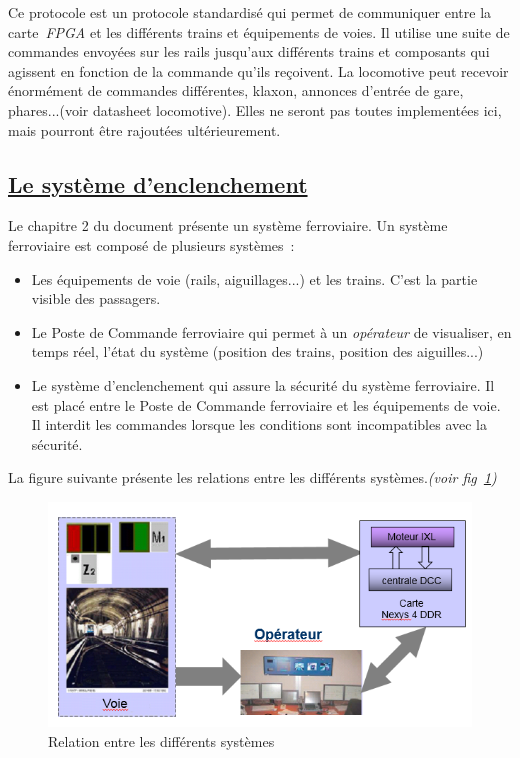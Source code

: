Ce protocole est un protocole standardis\'e qui permet de communiquer
entre la carte~\emph{FPGA} et les diff\'erents trains et
équipements de voies.
Il utilise une suite de commandes envoy\'ees sur les rails
jusqu'aux diff\'erents trains et composants qui agissent en fonction de
la commande qu'ils reçoivent.
La locomotive peut recevoir \'enormément de commandes différentes,
klaxon, annonces d'entr\'ee de gare, phares...(voir datasheet
locomotive). Elles ne seront pas toutes implement\'ees ici, mais
pourront \^etre rajout\'ees ult\'erieurement. 


\subsection{\underline{Le système d'enclenchement}}
\label{sec:logixl}

Le chapitre 2 du document \cite{sun2015} présente un système
ferroviaire. Un système ferroviaire est compos\'e de plusieurs systèmes~:
\begin{itemize}
  \item Les \'equipements de voie (rails, aiguillages...) et les
    trains. C'est la partie visible des passagers. 
  \item Le Poste de Commande ferroviaire qui permet à un \emph{op\'erateur} de
    visualiser, en temps r\'eel, l'\'etat du système (position des trains,
    position des aiguilles...)
  \item Le système d'enclenchement qui assure la s\'ecurit\'e du système
    ferroviaire. Il est plac\'e entre le Poste de Commande ferroviaire
    et les \'equipements de voie. Il interdit les commandes lorsque les
    conditions sont incompatibles avec la s\'ecurit\'e. 
\end{itemize}

La figure suivante pr\'esente les relations entre les diff\'erents
systèmes.\emph{(voir fig~\ref{fig3})}

\begin{figure}[h]
\centering
\includegraphics[scale=0.50]{sys_ferro.png}
\caption{Relation entre les différents systèmes}
\label{fig3}
\end{figure}

